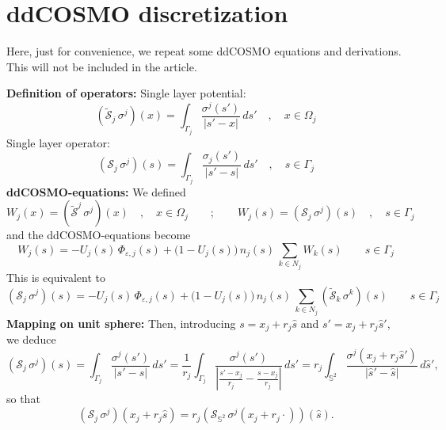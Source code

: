 \newpage
\section{ddCOSMO discretization\label{app2:mats}}
Here, just for convenience, we repeat some ddCOSMO equations and derivations. This will not be included in the article.

{\bf Definition of operators:}
Single layer potential:
\[
	(\tilde{\mathcal{S}}_j \,  \sigma^j) (x)
	= \int_{\Gamma_j} \frac{\sigma^j(s')}{|s'-x|} \, ds'
	 \quad , \quad x \in \Omega_j
\]
Single layer operator:
\[
	({\mathcal{S}}_j \,  \sigma^j) (s)
	= \int_{\Gamma_j} \frac{\sigma_j(s')}{|s'-s|} \, ds'
	 \quad , \quad s \in \Gamma_j
\]
{\bf ddCOSMO-equations:}
We defined
\begin{equation}
	W_j(x) = (\tilde{\mathcal{S}}^j \,  \sigma^j) (x) \quad , \quad x \in \Omega_j \qquad ; \qquad
	W_j(s) = (\mathcal{S}_j \,  \sigma^j) (s) \quad , \quad s \in \Gamma_j
\end{equation}
and the ddCOSMO-equations become
\begin{equation}
	W_j(s) = - U_j(s) \, \Phi_{\varepsilon,j}(s) +  \big (1 - U_j(s)\big ) \, n_j(s) \, \sum_{k \in N_j} {W}_k(s) \qquad s \in \Gamma_j
\end{equation}
This is equivalent to
\begin{equation}
	\label{eq:B1}
	({\mathcal{S}}_j \,  \sigma^j) (s) = - U_j(s) \, \Phi_{\varepsilon,j}(s) +  \big (1 - U_j(s)\big ) \, n_j(s) \, \sum_{k \in N_j} (\tilde{\mathcal{S}}_k \,  \sigma^k) (s) \qquad s \in \Gamma_j
\end{equation}
{\bf Mapping on unit sphere:}
Then, introducing $ s = x_j +r_j \hat s$ and $ s' = x_j +r_j \hat s'$, we deduce
\[
	({\mathcal{S}}_j \,  \sigma^j) (s)
	= \int_{\Gamma_j} \frac{\sigma^j(s')}{|s'-s|} \, ds'
	= \frac{1}{r_j} \int_{\Gamma_j} \frac{\sigma^j(s')}{\left |\tfrac{s'-x_j}{r_j}-\tfrac{s-x_j}{r_j}\right|} \, ds'
	= r_j \int_{\mathbb S^2} \frac{\sigma^j\left( x_j +r_j \hat s'\right)}{\left |\hat s'-\hat s\right|} \, d\hat s',
\]
so that
\[
	({\mathcal{S}}_j \,  \sigma^j) (x_j +r_j \hat s)
	= 
	r_j ({\mathcal{S}}_{\mathbb S^2} \,  \sigma^j(x_j +r_j \cdot ) ) (\hat s).
\]

